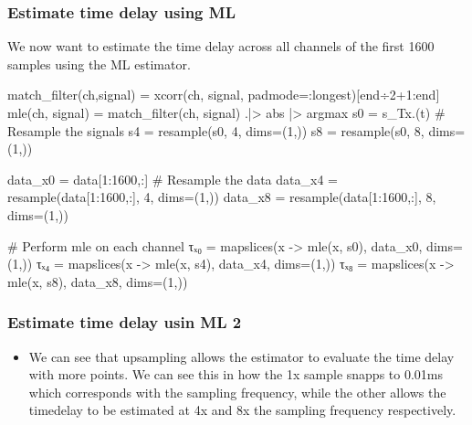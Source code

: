 \documentclass[compress]{beamer}
\begin{document}
\begin{frame}[fragile] %
    \frametitle{Estimate time delay using ML}
    We now want to estimate the time delay across all channels of the first 1600
    samples using the ML estimator. 
    \begin{jllisting}[gobble=8]
        match_filter(ch,signal) = xcorr(ch, signal, padmode=:longest)[end÷2+1:end] 
        mle(ch, signal) = match_filter(ch, signal) .|> abs |> argmax
        s0 = s_Tx.(t)
        # Resample the signals
        s4 = resample(s0, 4, dims=(1,))
        s8 = resample(s0, 8, dims=(1,))

        data_x0 = data[1:1600,:]
        # Resample the data
        data_x4 = resample(data[1:1600,:], 4, dims=(1,))
        data_x8 = resample(data[1:1600,:], 8, dims=(1,))

        # Perform mle on each channel 
        τₓ₀ = mapslices(x -> mle(x, s0), data_x0, dims=(1,))
        τₓ₄ = mapslices(x -> mle(x, s4), data_x4, dims=(1,))
        τₓ₈ = mapslices(x -> mle(x, s8), data_x8, dims=(1,))
    \end{jllisting}
\end{frame}

\begin{frame} %
    \frametitle{Estimate time delay usin ML 2}
    \begin{figure}
        
    \end{figure}
    \begin{itemize}
        \item We can see that upsampling allows the estimator to evaluate the
            time delay with more points. We can see this in how the 1x sample
            snapps to 0.01ms which corresponds with the sampling frequency,
            while the other allows the timedelay to be estimated at 4x and 8x
            the sampling frequency respectively.
    \end{itemize}
\end{frame} %
\end{document}
